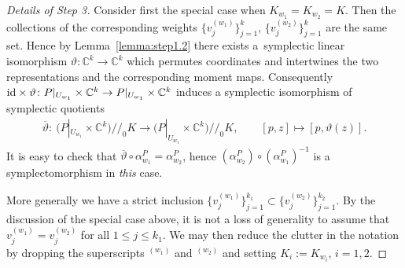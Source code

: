 \documentclass[pdftex]{sigma}
\numberwithin{equation}{section}
\begin{document}
\begin{proof}[Details of Step 3]
Consider f\/irst the special case when $K_{w_1} = K_{w_2} =K$.  Then the
collections of the correspon\-ding weights $\{
v_j^{(w_1)}\}_{j=1}^k$, $\{ v_j^{(w_2)}\}_{j=1}^k$ are the same set.
Hence by Lemma~\ref{lemma:step1.2} there exists a~symplectic linear
isomorphism $\vartheta\colon {\mathbb C}^k\to {\mathbb C}^k$ which permutes coordinates and
intertwines the two representations and the corresponding moment maps.
Consequently ${\rm id}\times \vartheta\colon P|_{U_{w_1}}\times {\mathbb C}^k \to
  P|_{U_{w_1}} \times {\mathbb C}^k$ induces a symplectic isomorphism of
    symplectic quotients
\begin{gather*}
\overline{\vartheta}\colon \ \big(P|_{U_{w_1}}\times {\mathbb C}^k\big)/\!/_0 K\to
  \big(P|_{U_{w_1}}\times {\mathbb C}^k\big)/\!/_0 K,\qquad [p,z]\mapsto [p,
    \vartheta(z)].
\end{gather*}
It is easy to check that $\overline{\vartheta}\circ \alpha^P_{w_1} =
\alpha^P_{w_2}$, hence $(\alpha^P_{w_2 })\circ (\alpha^P_{w_1})^{-1}$
is a symplectomorphism in {\em this} case.

More generally we have a strict inclusion $\{
v_j^{(w_1)}\}_{j=1}^{k_1}\subset \{ v_j^{(w_2)}\}_{j=1}^{k_2}$.  By
the discussion of the special case above, it is not a loss of generality
to assume that $v_j^{(w_1)} = v_j^{(w_2)}$ for all $1\leq j\leq k_1$.
We may then reduce the clutter in the notation by dropping the
superscripts $^{(w_1)}$ and $^{(w_2)}$ and setting $K_i:=K_{w_i}$, $i=1,2$.


\end{proof}
\end{document}
